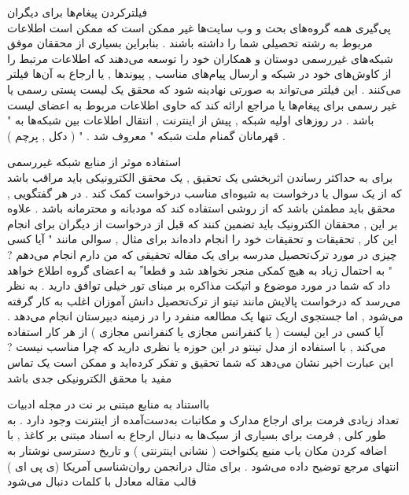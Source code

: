 \documentclass[xcolor=dvipsnames, professionalfont]{beamer}
\begin{document}
\begin{frame}
	فیلترکردن پیغام‌ها برای دیگران\\
	پی‌گیری همه گروه‌های بحث و وب سایت‌ها غیر ممکن است که ممکن است اطلاعات مربوط به رشته تحصیلی شما را داشته باشند . بنابراین بسیاری از محققان موفق شبکه‌های غیررسمی دوستان و همکاران خود را توسعه می‌دهند که اطلاعات مرتبط را از کاوش‌های خود در شبکه و ارسال پیام‌های مناسب , پیوندها , یا ارجاع به آن‌ها فیلتر می‌کنند . این فیلتر می‌تواند به صورتی نهادینه شود که محقق یک لیست پستی رسمی یا غیر رسمی برای پیغام‌ها یا مراجع ارائه کند که حاوی اطلاعات مربوط به اعضای لیست باشد . در روزهای اولیه شبکه , پیش از اینترنت , انتقال اطلاعات بین شبکه‌ها به " قهرمانان گمنام ملت شبکه " معروف شد . " ( دکل , پرچم ) . 
	
\end{frame}	
\begin{frame}
	استفاده موثر از منابع شبکه غیررسمی\\
	برای به حداکثر رساندن اثربخشی یک تحقیق , یک محقق الکترونیکی باید مراقب باشد که از یک سوال یا درخواست به شیوه‌ای مناسب درخواست کمک کند . در هر گفتگویی , محقق باید مطمئن باشد که از روشی استفاده کند که مودبانه و محترمانه باشد . علاوه بر این , محققان الکترونیک باید تضمین کنند که قبل از درخواست از دیگران برای انجام این کار , تحقیقات و تحقیقات خود را انجام داده‌اند
	برای مثال , سوالی مانند " آیا کسی چیزی در مورد ترک‌تحصیل مدرسه برای یک مقاله تحقیقی که من دارم انجام می‌دهم ? " به احتمال زیاد به هیچ کمکی منجر نخواهد شد و قطعا ً به اعضای گروه اطلاع خواهد داد که شما در مورد موضوع و اتیکت مذاکره بر مبنای تور خیلی توافق دارید . به نظر می‌رسد که درخواست پالایش مانند تیتو از ترک‌تحصیل دانش آموزان اغلب به کار گرفته می‌شود , اما جستجوی اریک تنها یک مطالعه منفرد را در زمینه دبیرستان انجام می‌دهد . آیا کسی در این لیست ( یا کنفرانس مجازی یا کنفرانس مجازی ) از هر کار استفاده می‌کند , با استفاده از مدل تینتو در این حوزه یا نظری دارید که چرا مناسب نیست ? این عبارت اخیر نشان می‌دهد که شما تحقیق و تفکر کرده‌اید و ممکن است یک تماس مفید با محقق الکترونیکی جدی باشد
	
\end{frame}	
\begin{frame}
	بااستناد به منابع مبتنی بر نت در مجله ادبیات\\
	تعداد زیادی فرمت برای ارجاع مدارک و مکاتبات به‌دست‌آمده از اینترنت وجود دارد . به طور کلی , فرمت برای بسیاری از سبک‌ها به دنبال ارجاع به اسناد مبتنی بر کاغذ , با اضافه کردن مکان یاب منبع یکنواخت ( نشانی اینترنتی ) و تاریخ دسترسی نوشتار به انتهای مرجع توضیح داده می‌شود . برای مثال درانجمن روان‌شناسی آمریکا (ی پی ای ) قالب مقاله معادل با کلمات دنبال می‌شود
\end{frame}	
\end{document}
